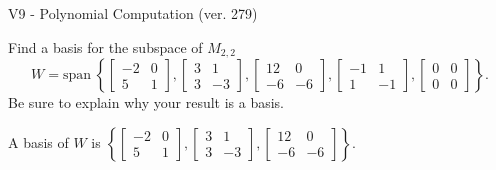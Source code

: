 \begin{exercise}
  \begin{exerciseTitle}V9 - Polynomial Computation (ver. 279)\end{exerciseTitle}
  \begin{exerciseStatement}
    Find a basis for the subspace of \(M_{2,2}\) 
\[W=\mathrm{span}\ \left\{\left[\begin{array}{cc}
-2 & 0 \\
5 & 1
\end{array}\right] , \left[\begin{array}{cc}
3 & 1 \\
3 & -3
\end{array}\right] , \left[\begin{array}{cc}
12 & 0 \\
-6 & -6
\end{array}\right] , \left[\begin{array}{cc}
-1 & 1 \\
1 & -1
\end{array}\right] , \left[\begin{array}{cc}
0 & 0 \\
0 & 0
\end{array}\right]\right\}.\]
 Be sure to explain why your result is a basis.


  \end{exerciseStatement}
  \begin{exerciseAnswer}
   A basis of \(W\) is  \(\left\{\left[\begin{array}{cc}
-2 & 0 \\
5 & 1
\end{array}\right] , \left[\begin{array}{cc}
3 & 1 \\
3 & -3
\end{array}\right] , \left[\begin{array}{cc}
12 & 0 \\
-6 & -6
\end{array}\right]\right\}\).
  


  \end{exerciseAnswer}
\end{exercise}